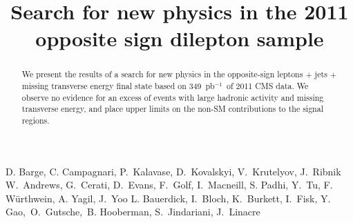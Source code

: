 \documentclass{cmspaper}
\newcommand{\lumi}{349~pb$^{-1}$}
\begin{document}
  

\begin{titlepage}
    \pagestyle {plain}

  \title {Search for new physics in the 2011 opposite sign dilepton sample}
\begin{Authlist}
D. Barge, C. Campagnari, P.~Kalavase, D.~Kovalskyi, V.~Krutelyov, J.~Ribnik
W.~Andrews, G.~Cerati, D.~Evans, F.~Golf, I.~Macneill, S. Padhi, Y.~Tu, F. W\"urthwein, A. Yagil, J.~Yoo
L. Bauerdick, I.~Bloch, K.~Burkett, I.~Fisk, Y.~ Gao,~O.~Gutsche,~B. Hooberman, S.~Jindariani, J.~Linacre
\end{Authlist}
 
\begin{abstract}
  We present the results of a search for new physics in the opposite-sign 
  leptons $+$ jets $+$ missing transverse energy final state based on \lumi\
  of 2011 CMS data. We observe no evidence for an excess of events
  with large hadronic activity and missing transverse energy, and place
  upper limits on the non-SM contributions to the signal regions.
\end{abstract}

\end{titlepage}
\newpage


\tableofcontents
\newpage
\linenumbers
%










%






\clearpage

\clearpage
\appendixtitleon
\appendixtitletocon
\begin{appendices}
   
   
   
   
\end{appendices}
\end{document}
